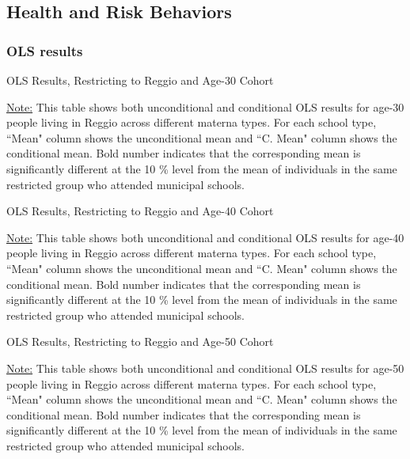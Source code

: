 \documentclass[11pt]{article}
\begin{document}
\subsection{Health and Risk Behaviors}

\subsubsection{OLS results}
\begin{table}[H]
\begin{center}
	\caption{OLS Results, Restricting to Reggio and Age-30 Cohort} \label{table:OLS-R30-H}
	\scalebox{0.73}{
		
	}
	\end{center}
	\footnotesize
\underline{Note:} This table shows both unconditional and conditional OLS results for age-30 people living in Reggio across different materna types. For each school type, ``Mean" column shows the unconditional mean and ``C. Mean" column shows the conditional mean. Bold number indicates that the corresponding mean is significantly different at the 10 \% level from the mean of individuals in the same restricted group who attended municipal schools.

\end{table}

\begin{table}[H]
\begin{center}
	\caption{OLS Results, Restricting to Reggio and Age-40 Cohort} \label{table:OLS-R40-H}
	\scalebox{0.73}{
		
	}
	\end{center}
	\footnotesize
\underline{Note:} This table shows both unconditional and conditional OLS results for age-40 people living in Reggio across different materna types. For each school type, ``Mean" column shows the unconditional mean and ``C. Mean" column shows the conditional mean. Bold number indicates that the corresponding mean is significantly different at the 10 \% level from the mean of individuals in the same restricted group who attended municipal schools.

\end{table}

\begin{table}[H]
\begin{center}
	\caption{OLS Results, Restricting to Reggio and Age-50 Cohort} \label{table:OLS-R50-H}
	\scalebox{0.73}{
		
	}
	\end{center}
	\footnotesize
\underline{Note:} This table shows both unconditional and conditional OLS results for age-50 people living in Reggio across different materna types. For each school type, ``Mean" column shows the unconditional mean and ``C. Mean" column shows the conditional mean. Bold number indicates that the corresponding mean is significantly different at the 10 \% level from the mean of individuals in the same restricted group who attended municipal schools.

\end{table}
\end{document}
